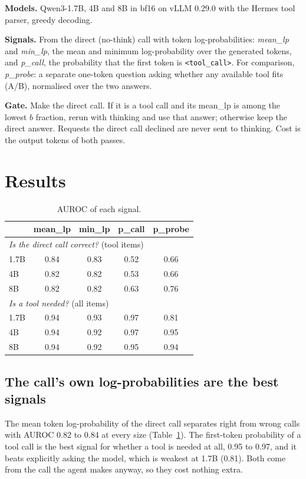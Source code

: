 \documentclass[10pt,twocolumn]{article}
\begin{document}
\textbf{Models.} Qwen3-1.7B, 4B and 8B \cite{qwen3} in bf16 on vLLM 0.29.0 \cite{vllm} with the Hermes tool parser,
greedy decoding.

\textbf{Signals.} From the direct (no-think) call with token log-probabilities: \emph{mean\_lp} and \emph{min\_lp},
the mean and minimum log-probability over the generated tokens, and \emph{p\_call}, the probability that the first
token is \texttt{<tool\_call>}. For comparison, \emph{p\_probe}: a separate one-token question asking whether any
available tool fits (A/B), normalised over the two answers.

\textbf{Gate.} Make the direct call. If it is a tool call and its mean\_lp is among the lowest $b$ fraction, rerun
with thinking and use that answer; otherwise keep the direct answer. Requests the direct call declined are never sent
to thinking. Cost is the output tokens of both passes.

\section{Results}

\begin{table}[t]
\centering\small
\begin{tabular}{lcccc}
\toprule
& mean\_lp & min\_lp & p\_call & p\_probe \\
\midrule
\multicolumn{5}{l}{\emph{Is the direct call correct?} (tool items)} \\
1.7B & 0.84 & 0.83 & 0.52 & 0.66 \\
4B & 0.82 & 0.82 & 0.53 & 0.66 \\
8B & 0.82 & 0.82 & 0.63 & 0.76 \\
\midrule
\multicolumn{5}{l}{\emph{Is a tool needed?} (all items)} \\
1.7B & 0.94 & 0.93 & 0.97 & 0.81 \\
4B & 0.94 & 0.92 & 0.97 & 0.95 \\
8B & 0.94 & 0.92 & 0.95 & 0.94 \\
\bottomrule
\end{tabular}
\caption{AUROC of each signal.}
\label{tab:sig}
\end{table}

\subsection{The call's own log-probabilities are the best signals}

The mean token log-probability of the direct call separates right from wrong calls with AUROC 0.82 to 0.84 at every
size (Table~\ref{tab:sig}). The first-token probability of a tool call is the best signal for whether a tool is needed
at all, 0.95 to 0.97, and it beats explicitly asking the model, which is weakest at 1.7B (0.81). Both come from the
call the agent makes anyway, so they cost nothing extra.
\end{document}
